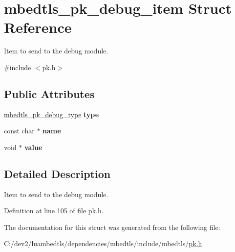 \hypertarget{structmbedtls__pk__debug__item}{\section{mbedtls\-\_\-pk\-\_\-debug\-\_\-item Struct Reference}
\label{structmbedtls__pk__debug__item}
}


Item to send to the debug module.  




{\ttfamily \#include $<$pk.\-h$>$}

\subsection*{Public Attributes}
\begin{DoxyCompactItemize}
\item 
\hypertarget{structmbedtls__pk__debug__item_ae9d86be304da9a0adea3ad93216c2a97}{\hyperlink{pk_8h_a959c5419b3dd34df5420ee83bbc54002}{mbedtls\-\_\-pk\-\_\-debug\-\_\-type} {\bfseries type}}\label{structmbedtls__pk__debug__item_ae9d86be304da9a0adea3ad93216c2a97}

\item 
\hypertarget{structmbedtls__pk__debug__item_a708ff418333bcfb0be9ef97d7b9d396c}{const char $\ast$ {\bfseries name}}\label{structmbedtls__pk__debug__item_a708ff418333bcfb0be9ef97d7b9d396c}

\item 
\hypertarget{structmbedtls__pk__debug__item_a1f5c5650c738f698d1bf34011996e5f2}{void $\ast$ {\bfseries value}}\label{structmbedtls__pk__debug__item_a1f5c5650c738f698d1bf34011996e5f2}

\end{DoxyCompactItemize}


\subsection{Detailed Description}
Item to send to the debug module. 

Definition at line 105 of file pk.\-h.



The documentation for this struct was generated from the following file\-:\begin{DoxyCompactItemize}
\item 
C\-:/dev2/luambedtls/dependencies/mbedtls/include/mbedtls/\hyperlink{pk_8h}{pk.\-h}\end{DoxyCompactItemize}

